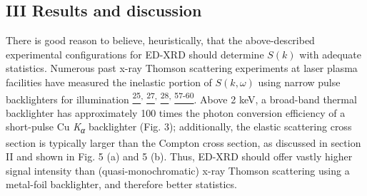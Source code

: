 \subsection{III Results and
discussion}\label{iii-results-and-discussion}

There is good reason to believe, heuristically, that the above-described
experimental configurations for ED-XRD should determine
\(S\left( k \right)\) with adequate statistics. Numerous past x-ray
Thomson scattering experiments at laser plasma facilities have measured
the inelastic portion of \(S\left( k,\omega \right)\) using narrow pulse
backlighters for illumination
\hyperref[s.-h.-glenzer-and-r.-redmer-reviews-of-modern-physics-81-1625-2009.]{\textsuperscript{25}}\textsuperscript{,}
\hyperref[h.-j.-lee-et-al.-physical-review-letters-102-115001-2009.]{\textsuperscript{27}}\textsuperscript{,}
\hyperref[c.-fortmann-h.-j.-lee-t.-doeppner-r.-w.-falcone-a.-l.-kritcher-o.-l.-landen-and-s.-h.-glenzer-physical-review-letters-108-175006-2012.]{\textsuperscript{28}}\textsuperscript{,}
\hyperref[r.-tommasini-et-al.-review-of-scientific-instruments-79-10e901-2008.]{\textsuperscript{57-60}}.
Above 2 keV, a broad-band thermal backlighter has approximately 100
times the photon conversion efficiency of a short-pulse Cu
\emph{K\textsubscript{α}} backlighter (Fig. 3); additionally, the
elastic scattering cross section is typically larger than the Compton
cross section, as discussed in section II and shown in Fig. 5 (a) and 5
(b). Thus, ED-XRD should offer vastly higher signal intensity than
(quasi-monochromatic) x-ray Thomson scattering using a metal-foil
backlighter, and therefore better statistics.

